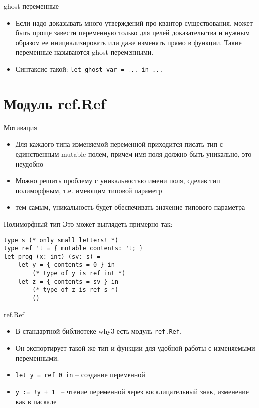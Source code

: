 \documentclass[hyperref={unicode=true}]{beamer}
\begin{document}
    \begin{frame}{ghost-переменные}
    \begin{itemize}
    \item
    Если надо доказывать много утверждений про квантор существования,
    может быть проще завести переменную только для целей доказательства
    и нужным образом ее инициализировать или даже изменять прямо
    в функции. Такие переменные называются ghost-переменными.
    \item
    Синтаксис такой: \texttt{let ghost var = ... in ...}
    \end{itemize}
    \end{frame}

    \section{Модуль ref.Ref}

    \begin{frame}{Мотивация}
    \begin{itemize}
    \item
    Для каждого типа изменяемой переменной приходится писать
    тип с единственным mutable полем, причем имя поля должно
    быть уникально, это неудобно
    \item
    Можно решить проблему с уникальностью имени поля, сделав
    тип полиморфным, т.е. имеющим типовой параметр
    \item
    тем самым, уникальность будет обеспечивать
    значение типового параметра
    \end{itemize}
    \end{frame}

    \begin{frame}[fragile]{Полиморфный тип}
    Это может выглядеть примерно так:
    \begin{lstlisting}
type s (* only small letters! *)
type ref 't = { mutable contents: 't; }
let prog (x: int) (sv: s) =
    let y = { contents = 0 } in
        (* type of y is ref int *)
    let z = { contents = sv } in
        (* type of z is ref s *)
        ()
    \end{lstlisting}
    \end{frame}

    \begin{frame}{ref.Ref}
    \begin{itemize}
    \item
    В стандартной библиотеке why3 есть модуль \texttt{ref.Ref}.
    \item
    Он экспортирует такой же тип и функции для удобной работы
    с изменяемыми переменными.
    \item
    \texttt{let y = ref 0 in} -- создание переменной
    \item
    \texttt{y := !y + 1 } -- чтение переменной через
    восклицательный знак, изменение как в паскале
    \end{itemize}
    \end{frame}
\end{document}
